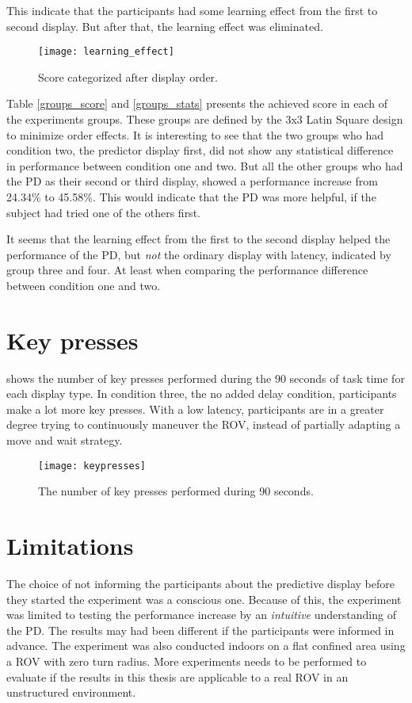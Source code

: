 This indicate that the participants had some learning effect from the first to second display. But after that, the learning effect was eliminated.

\begin{figure}[h!]
    \centering
    \texttt{[image: learning\_effect]}
    \caption{Score categorized after display order.}
    \label{learning_effect}
\end{figure}

\clearpage
Table \ref{groups_score} and \ref{groups_stats} presents the achieved score in each of the experiments groups. These groups are defined by the 3x3 Latin Square design to minimize order effects. It is interesting to see that the two groups who had condition two, the predictor display first, did not show any statistical difference in performance between condition one and two. But all the other groups who had the PD as their second or third display, showed a performance increase from 24.34\% to 45.58\%. This would indicate that the PD was more helpful, if the subject had tried one of the others first.

It seems that the learning effect from the first to the second display helped the performance of the PD, but \emph{not} the ordinary display with latency, indicated by group three and four. At least when comparing the performance  difference between condition one and two.




\clearpage
\section{Key presses}

 shows the number of key presses performed during the 90 seconds of task time for each display type. In condition three, the no added delay condition, participants make a lot more key presses. With a low latency, participants are in a greater degree trying to continuously maneuver the ROV, instead of partially adapting a move and wait strategy.

\begin{figure}[h!]
    \centering
    \texttt{[image: keypresses]}
    \caption{The number of key presses performed during 90 seconds.}
    \label{keypresses}
    \vspace{-5mm}
\end{figure}

\section{Limitations}

The choice of not informing the participants about the predictive display before they started the experiment was a conscious one. Because of this, the experiment was limited to testing the performance increase by an \emph{intuitive} understanding of the PD. The results may had been different if the participants were informed in advance. The experiment was also conducted indoors on a flat confined area using a ROV with zero turn radius. More experiments needs to be performed to evaluate if the results in this thesis are applicable to a real ROV in an unstructured environment.
